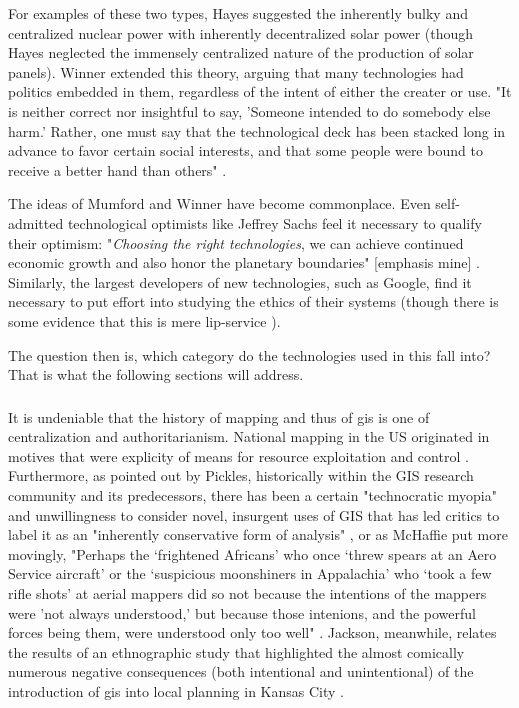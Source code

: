 For examples of these two types, Hayes suggested the inherently bulky and centralized nuclear power with inherently decentralized solar power \cite{hayesRaysHopeTransition1977} (though Hayes neglected the immensely centralized nature of the production of solar panels). Winner extended this theory, arguing that many technologies had politics embedded in them, regardless of the intent of either the creater or use. "It is neither correct nor insightful to say, 'Someone intended to do somebody else harm.' Rather, one must say that the technological deck has been stacked long in advance to favor certain social interests, and that some people were bound to receive a better hand than others" \cite{winnerArtifactsHavePolitics1980}.

The ideas of Mumford and Winner have become commonplace. Even self-admitted technological optimists like Jeffrey Sachs \cite{sachsOptimismNewYear2021} feel it necessary to qualify their optimism: "\textit{Choosing the right technologies}, we can achieve continued economic growth and also honor the planetary boundaries" [emphasis mine] \cite{sachsAgeSustainableDevelopment2015}. Similarly, the largest developers of new technologies, such as Google, find it necessary to put effort into studying the ethics of their systems (though there is some evidence that this is mere lip-service \cite{simoniteWhatReallyHappened}). 

The question then is, which category do the technologies used in this fall into? That is what the following sections will address.

\subsubsection{}

It is undeniable that the history of mapping and thus of \ac{gis} is one of centralization and authoritarianism. National mapping in the US originated in motives that were explicity of means for resource exploitation and control \cite{mchaffieManufacturingMetaphors1994}. Furthermore, as pointed out by Pickles, historically within the GIS research community and its predecessors, there has been a certain "technocratic myopia" and unwillingness to consider novel, insurgent uses of GIS that has led critics to label it as an "inherently conservative form of analysis" \cite{picklesRepresentationsElectronicAge1994}, or as McHaffie put more movingly, "Perhaps the `frightened Africans' who once `threw spears at an Aero Service aircraft' or the `suspicious moonshiners in Appalachia' who `took a few rifle shots' at aerial mappers did so not because the intentions of the mappers were 'not always understood,' but because those intenions, and the powerful forces being them, were understood only too well" \cite{mchaffieManufacturingMetaphors1994}. Jackson, meanwhile, relates the results of an ethnographic study that highlighted the almost comically numerous negative consequences (both intentional and unintentional) of the introduction of \ac{gis} into local planning in Kansas City \cite{jacksonCityThirtyThousand2008}.


